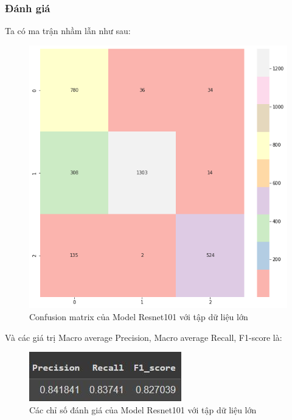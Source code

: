 \subsubsection{Đánh giá}
Ta có ma trận nhầm lẫn như sau:
\begin{center}
    \begin{figure}[!h]
        \centering
        \includegraphics[scale = 0.4]{fileanh/Resnet_increase1.png}
        \caption{Confusion matrix của Model Resnet101 với tập dữ liệu lớn}
    \end{figure}
\end{center}

Và các giá trị Macro average Precision, Macro average Recall, F1-score là:
\begin{center}
    \begin{figure}[!h]
        \centering
        \includegraphics[scale = 1.2]{fileanh/Resnet_increase2.jpg}
        \caption{Các chỉ số đánh giá của Model Resnet101 với tập dữ liệu lớn}
    \end{figure}
\end{center}


